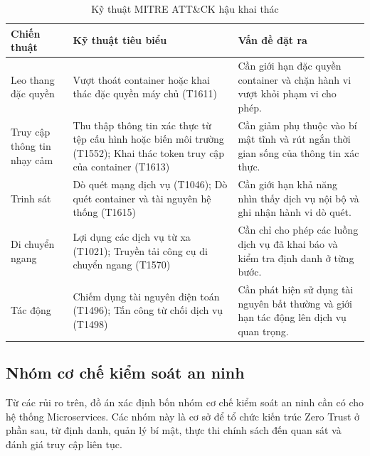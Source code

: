 \begin{table}[H]
\centering
\caption{Kỹ thuật MITRE ATT\&CK hậu khai thác}
\label{tab:mitre_phase2}
\renewcommand{\arraystretch}{1.3}
\TableRiskColors
\begin{tabularx}{\textwidth}{|L{3.5cm}|Y|L{4.5cm}|}
\hline
{}
\textbf{Chiến thuật} &
\textbf{Kỹ thuật tiêu biểu} &
\textbf{Vấn đề đặt ra} \\
\hline

Leo thang đặc quyền &
Vượt thoát container hoặc khai thác đặc quyền máy chủ (T1611) &
Cần giới hạn đặc quyền container và chặn hành vi vượt khỏi phạm vi cho phép. \\
\hline

Truy cập thông tin nhạy cảm &
Thu thập thông tin xác thực từ tệp cấu hình hoặc biến môi trường (T1552); Khai thác token truy cập của container (T1613) &
Cần giảm phụ thuộc vào bí mật tĩnh và rút ngắn thời gian sống của thông tin xác thực. \\
\hline

Trinh sát &
Dò quét mạng dịch vụ (T1046); Dò quét container và tài nguyên hệ thống (T1615) &
Cần giới hạn khả năng nhìn thấy dịch vụ nội bộ và ghi nhận hành vi dò quét. \\
\hline

Di chuyển ngang &
Lợi dụng các dịch vụ từ xa (T1021); Truyền tải công cụ di chuyển ngang (T1570) &
Cần chỉ cho phép các luồng dịch vụ đã khai báo và kiểm tra định danh ở từng bước. \\
\hline

Tác động &
Chiếm dụng tài nguyên điện toán (T1496); Tấn công từ chối dịch vụ (T1498) &
Cần phát hiện sử dụng tài nguyên bất thường và giới hạn tác động lên dịch vụ quan trọng. \\
\hline

\end{tabularx}
\end{table}


\subsection{Nhóm cơ chế kiểm soát an ninh}
\label{sec:security_control_groups}
Từ các rủi ro trên, đồ án xác định bốn nhóm cơ chế kiểm soát an ninh cần có cho hệ thống Microservices. Các nhóm này là cơ sở để tổ chức kiến trúc Zero Trust ở phần sau, từ định danh, quản lý bí mật, thực thi chính sách đến quan sát và đánh giá truy cập liên tục.

